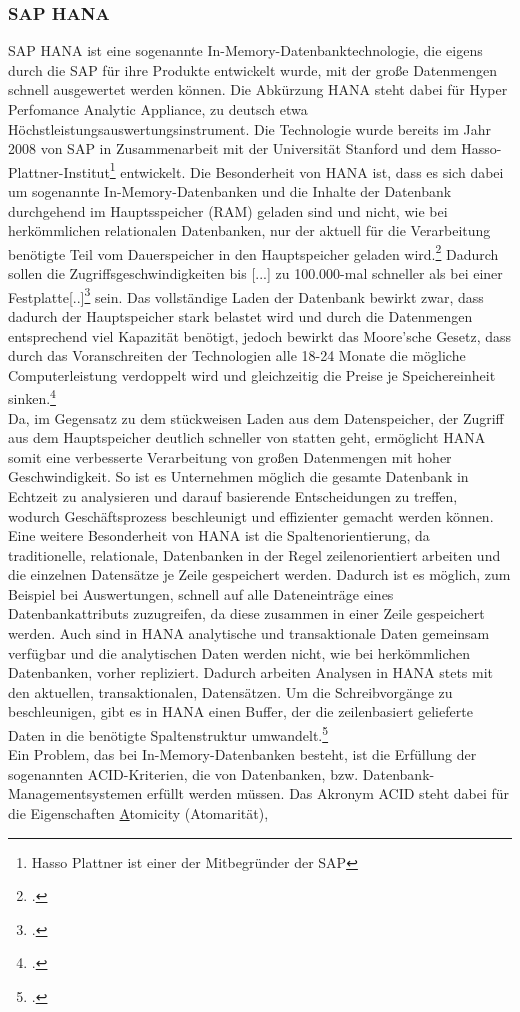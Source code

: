 \subsubsection{SAP HANA}
\label{kap:HANA}
SAP HANA ist eine sogenannte \glqq{}In-Memory\grqq{}-Datenbanktechnologie, die eigens durch die SAP für ihre Produkte entwickelt wurde, mit der große Datenmengen schnell ausgewertet werden können. Die Abkürzung HANA steht dabei für \glqq{}Hyper Perfomance Analytic Appliance\grqq{}, zu deutsch etwa \glqq{}Höchstleistungsauswertungsinstrument\grqq{}. Die Technologie wurde bereits im Jahr 2008 von SAP in Zusammenarbeit mit der Universität Stanford und dem Hasso-Plattner-Institut\footnote{Hasso Plattner ist einer der Mitbegründer der SAP} entwickelt. Die Besonderheit von HANA ist, dass es sich dabei um sogenannte \glqq{}In-Memory-Datenbanken\grqq{} und die Inhalte der Datenbank durchgehend im Hauptsspeicher (RAM) geladen sind und nicht, wie bei herkömmlichen relationalen Datenbanken, nur der aktuell für die Verarbeitung benötigte Teil vom Dauerspeicher in den Hauptspeicher geladen wird.\footcite[Vgl.][]{was-hana} Dadurch sollen die Zugriffsgeschwindigkeiten bis \glqq{}[...] zu 100.000-mal schneller als bei einer Festplatte[..]\grqq{}\footcite[Vgl.][]{rz10-hana} sein. Das vollständige Laden der Datenbank bewirkt zwar, dass dadurch der Hauptspeicher stark belastet wird und durch die Datenmengen entsprechend viel Kapazität benötigt, jedoch bewirkt das Moore'sche Gesetz, dass durch das Voranschreiten der Technologien alle 18-24 Monate die mögliche Computerleistung verdoppelt wird und gleichzeitig die Preise je Speichereinheit sinken.\footcite[Vgl.][]{mooresches}\\ Da, im Gegensatz zu dem stückweisen Laden aus dem Datenspeicher, der Zugriff aus dem Hauptspeicher deutlich schneller von statten geht, ermöglicht HANA somit eine verbesserte Verarbeitung von großen Datenmengen mit hoher Geschwindigkeit. So ist es Unternehmen möglich die gesamte Datenbank in Echtzeit zu analysieren und darauf basierende Entscheidungen zu treffen, wodurch Geschäftsprozess beschleunigt und effizienter gemacht werden können. Eine weitere Besonderheit von HANA ist die Spaltenorientierung, da traditionelle, relationale, Datenbanken in der Regel zeilenorientiert arbeiten und die einzelnen Datensätze je Zeile gespeichert werden. Dadurch ist es möglich, zum Beispiel bei Auswertungen, schnell auf alle Dateneinträge eines Datenbankattributs zuzugreifen, da diese zusammen in einer Zeile gespeichert werden. Auch sind in HANA analytische und transaktionale Daten gemeinsam verfügbar und die analytischen Daten werden nicht, wie bei herkömmlichen Datenbanken, vorher repliziert. Dadurch arbeiten Analysen in HANA stets mit den aktuellen, transaktionalen, Datensätzen. Um die Schreibvorgänge zu beschleunigen, gibt es in HANA einen Buffer, der die zeilenbasiert gelieferte Daten in die benötigte Spaltenstruktur umwandelt.\footcite[Vgl.][]{was-hana}\\Ein Problem, das bei In-Memory-Datenbanken besteht, ist die Erfüllung der sogenannten ACID-Kriterien, die von Datenbanken, bzw. Datenbank-Managementsystemen erfüllt werden müssen. Das Akronym \glqq{}ACID\grqq{} steht dabei für die Eigenschaften \underline{A}tomicity (Atomarität), 